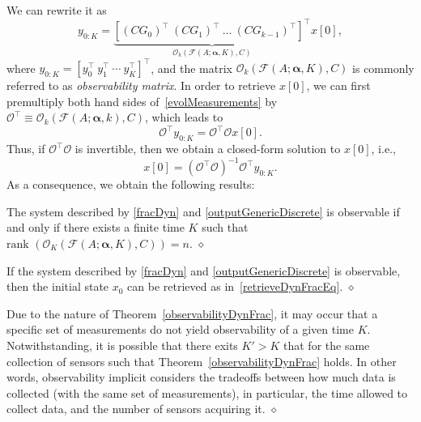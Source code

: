 We can rewrite it as
\begin{equation}
y_{0:K}=\underbrace{[(CG_0)^{\intercal} \ (CG_1)^{\intercal} \ \ldots \ (CG_{k-1})^{\intercal}]^{\intercal}}_{\mathcal O_k(\mathcal F(A;\mathbf{\alpha},K),C)}x[0],
\label{evolMeasurements}
\end{equation}
where $y_{0:K}=[y^\intercal_0 \  y^\intercal_1 \ \cdots \ y^\intercal_K]^\intercal$, and the matrix $\mathcal O_k(\mathcal F(A;\mathbf{\alpha},K),C)$ is commonly referred to as \emph{observability matrix}. In order to retrieve $x[0]$, we can first premultiply both hand sides of~\eqref{evolMeasurements} by $\mathcal O^{\intercal}\equiv\mathcal O_k(\mathcal F(A;\mathbf{\alpha},k),C)$, which leads to
\[
\mathcal O^{\intercal}y_{0:K}=\mathcal O^{\intercal}\mathcal Ox[0].
\]
Thus, if $\mathcal O^{\intercal}\mathcal O$ is invertible, then we obtain a closed-form solution to $x[0]$, i.e., 
\begin{equation}
x[0]=(\mathcal O^{\intercal}\mathcal O)^{-1}\mathcal O^{\intercal}y_{0:K}.\label{retrieveDynFracEq}
\end{equation}
As a consequence, we obtain the following results:




\begin{theorem}
The system described by \eqref{fracDyn} and \eqref{outputGenericDiscrete}  is observable if and only if there exists a finite time $K$ such that $\text{rank } (\mathcal O_K(\mathcal F(A;\mathbf{\alpha},K),C))=n$. \hfill $\diamond$
\label{observabilityDynFrac}
\end{theorem}





\begin{theorem}
If the system described by \eqref{fracDyn} and \eqref{outputGenericDiscrete}  is observable, then the initial state $x_0$ can be retrieved as in~\eqref{retrieveDynFracEq}.
\hfill $\diamond$
\label{retrieveDynFrac}
\end{theorem}

\begin{remark}
Due to the nature of Theorem~\ref{observabilityDynFrac}, it may occur that a specific set of measurements do not yield observability of a given time $K$. Notwithstanding, it is possible that there exits  $K'>K$ that for the same collection of sensors  such that Theorem~\ref{observabilityDynFrac} holds. In other words, observability implicit considers the tradeoffs between how much data is collected (with the same set of measurements), in particular, the  time allowed to collect data, and the number of sensors  acquiring it. \hfill $\diamond$
\end{remark}


